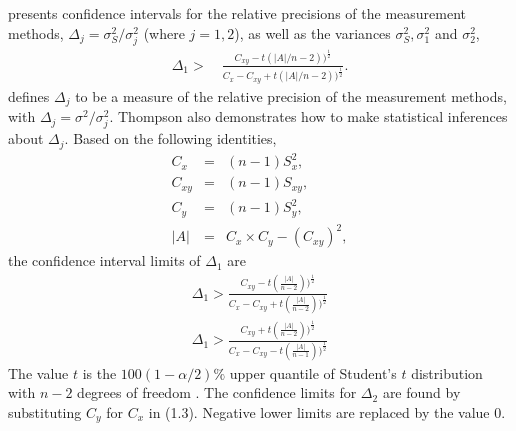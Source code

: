 \documentclass[12pt, a4paper]{report}
\theoremstyle{plain}
\theoremstyle{definition}
\theoremstyle{remark}
\begin{document}
\citet{Thompson} presents confidence intervals for the relative
precisions of the measurement methods, $\Delta_{j}=
\sigma^2_{S}/\sigma^2_{j}$ (where $j=1,2$), as well as the
variances $\sigma^{2}_{S}, \sigma^{2}_{1}$ and $\sigma^{2}_{2}$,
\begin{eqnarray}
\Delta_{1} >\quad \frac{C_{xy}-
	t(|A|/n-2))^{\frac{1}{2}}}{C_{x}-C_{xy}+
	t(|A|/n-2))^{\frac{1}{2}}}.
\end{eqnarray}
\citet{Thompson} defines $\Delta_{j}$ to be a measure of the
relative precision of the measurement methods, with $\Delta_{j}=
\sigma^2/\sigma^2_{j}$. Thompson also demonstrates how to make statistical inferences about $\Delta_{j}$.
Based on the following identities,
\begin{eqnarray*}
	C_{x}&=&(n-1)S^2_{x},\nonumber\\
	C_{xy}&=&(n-1)S_{xy},\nonumber\\
	C_{y}&=&(n-1)S^2_{y},\nonumber\\
	|A| &=& C_{x}\times C_{y} - (C_{xy})^2,\nonumber
\end{eqnarray*}
\noindent the confidence interval limits of $\Delta_{1}$ are
\begin{eqnarray}
\Delta_{1} > \frac{C_{xy}-
	t(\frac{|A|}{n-2}))^{\frac{1}{2}}}{C_{x}-C_{xy}+
	t(\frac{|A|}{n-2}))^{\frac{1}{2}}} \\
\Delta_{1} > \frac{C_{xy}+
	t(\frac{|A|}{n-2}))^{\frac{1}{2}}}{C_{x}-C_{xy}-
	t(\frac{|A|}{n-1}))^{\frac{1}{2}}} \nonumber
\end{eqnarray}
The value $t$ is the $100(1-\alpha/2)\%$ upper quantile of
Student's $t$ distribution with $n-2$ degrees of freedom
\citep{Kinsella}. The confidence limits for $\Delta_{2}$ are found by substituting $C_{y}$ for $C_{x}$ in (1.3).
Negative lower limits are replaced by the value $0$.


\end{document}
